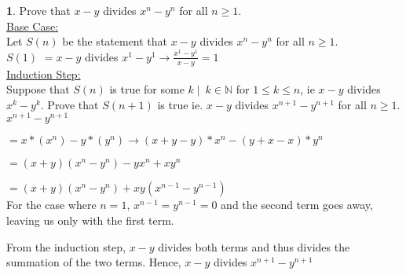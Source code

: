 \documentclass[12pt,a4paper]{article}
\newcommand{\N}{\mathbb{N}}
\theoremstyle{definition}
\newtheorem{problem}{}
\begin{document}
\begin{problem}
Prove that $x-y$ divides $x^n-y^n$ for all $n\geq 1$. \\

\underline{Base Case:} \\
Let $S(n)$ be the statement that $x-y$ divides $x^n-y^n$ for all $n\geq 1$. \\
$S(1)$ $= x - y$ divides $x^1 - y^1 \rightarrow \frac{x^1 - y^1}{x - y} = 1$ \\

\underline{Induction Step:} \\
Suppose that $S(n)$ is true for some $k \mid \ k \in \N$ for $1 \leq k \leq n$, ie $x - y$ divides $x^k - y^k$. Prove that $S(n + 1)$ is true ie. $x - y$ divides $x^{n + 1} - y^{n + 1}$ for all $n\geq 1$. \\

$x^{n + 1} - y^{n + 1}$

$= x*(x^n) - y*(y^n) \rightarrow (x + y - y)*x^n - (y + x - x)*y^n$

$= (x + y)(x^n - y^n) - yx^n + xy^n$

$= (x + y)(x^n - y^n) + xy(x^{n - 1} - y^{n -1})$ \\

For the case where $n = 1$, $x^{n - 1} = y^{n - 1} = 0$ and the second term goes away, leaving us only with the first term.

From the induction step, $x - y$ divides both terms and thus divides the summation of the two terms. Hence, $x - y$ divides $x^{n + 1} - y^{n +1}$

\end{problem}
\end{document}
